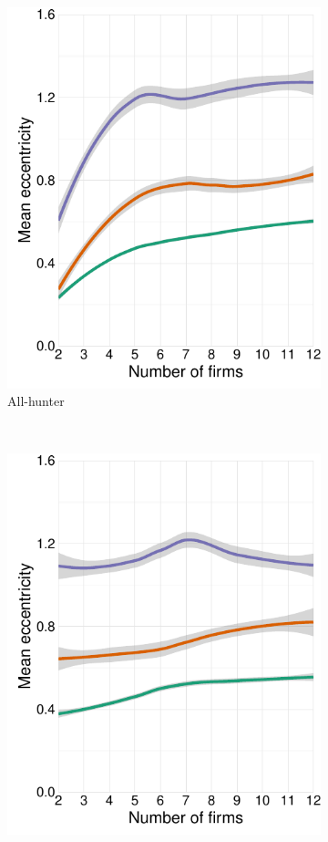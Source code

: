 \documentclass[preprint, 12pt]{elsarticle}
\begin{document}
\begin{figure}[ht!]
\begin{subfigure}[t]{0.315\textwidth}
		\includegraphics[width=\textwidth, trim={8mm 0 0 0}]{Graphics/fig321a_tall.pdf}
		\caption{All-hunter}
		\label{fig:eccentricity_hunter}
	\end{subfigure}
	~
	\begin{subfigure}[t]{0.315\textwidth}
		\includegraphics[width=\textwidth, trim={8mm 0 0 0}]{Graphics/fig341a_tall.pdf}

\end{subfigure}
\end{figure}
\end{document}

